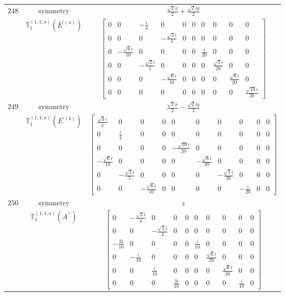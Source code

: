\documentclass[fleqn,8pt,landscape]{jsarticle}
\begin{document}
\begin{longtable}{ccc}
$ 248 $ & $ \text{symmetry} $ & $ \frac{\sqrt{2} x}{2} + \frac{\sqrt{2} i y}{2} $ \\
$  $ & $ \mathbb{T}_{1}^{(1,1;a)}(E^{\prime(a)}) $ & $ \begin{bmatrix} 0 & 0 & - \frac{i}{4} & 0 & 0 & 0 & 0 & 0 & 0 & 0 \\ 0 & 0 & 0 & - \frac{\sqrt{3} i}{4} & 0 & 0 & 0 & 0 & 0 & 0 \\ 0 & - \frac{\sqrt{6} i}{10} & 0 & 0 & 0 & 0 & \frac{i}{20} & 0 & 0 & 0 \\ 0 & 0 & - \frac{\sqrt{2} i}{5} & 0 & 0 & 0 & 0 & \frac{\sqrt{3} i}{20} & 0 & 0 \\ 0 & 0 & 0 & - \frac{\sqrt{6} i}{10} & 0 & 0 & 0 & 0 & \frac{\sqrt{6} i}{20} & 0 \\ 0 & 0 & 0 & 0 & 0 & 0 & 0 & 0 & 0 & \frac{\sqrt{10} i}{20} \end{bmatrix} $ \\ \hline
$ 249 $ & $ \text{symmetry} $ & $ \frac{\sqrt{2} x}{2} - \frac{\sqrt{2} i y}{2} $ \\
$  $ & $ \mathbb{T}_{1}^{(1,1;a)}(E^{\prime(b)}) $ & $ \begin{bmatrix} \frac{\sqrt{3} i}{4} & 0 & 0 & 0 & 0 & 0 & 0 & 0 & 0 & 0 \\ 0 & \frac{i}{4} & 0 & 0 & 0 & 0 & 0 & 0 & 0 & 0 \\ 0 & 0 & 0 & 0 & - \frac{\sqrt{10} i}{20} & 0 & 0 & 0 & 0 & 0 \\ - \frac{\sqrt{6} i}{10} & 0 & 0 & 0 & 0 & - \frac{\sqrt{6} i}{20} & 0 & 0 & 0 & 0 \\ 0 & - \frac{\sqrt{2} i}{5} & 0 & 0 & 0 & 0 & - \frac{\sqrt{3} i}{20} & 0 & 0 & 0 \\ 0 & 0 & - \frac{\sqrt{6} i}{10} & 0 & 0 & 0 & 0 & - \frac{i}{20} & 0 & 0 \end{bmatrix} $ \\ \hline
$ 250 $ & $ \text{symmetry} $ & $ z $ \\
$  $ & $ \mathbb{T}_{1}^{(1,1;a)}(A^{\prime\prime}) $ & $ \begin{bmatrix} 0 & - \frac{\sqrt{2} i}{4} & 0 & 0 & 0 & 0 & 0 & 0 & 0 & 0 \\ 0 & 0 & - \frac{\sqrt{2} i}{4} & 0 & 0 & 0 & 0 & 0 & 0 & 0 \\ - \frac{3 i}{10} & 0 & 0 & 0 & 0 & \frac{i}{10} & 0 & 0 & 0 & 0 \\ 0 & - \frac{i}{10} & 0 & 0 & 0 & 0 & \frac{\sqrt{6} i}{20} & 0 & 0 & 0 \\ 0 & 0 & \frac{i}{10} & 0 & 0 & 0 & 0 & \frac{\sqrt{6} i}{20} & 0 & 0 \\ 0 & 0 & 0 & \frac{3 i}{10} & 0 & 0 & 0 & 0 & \frac{i}{10} & 0 \end{bmatrix} $ \\ \hline

\end{longtable}
\end{document}

